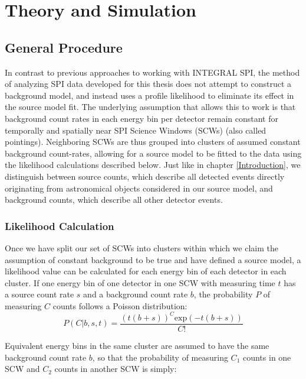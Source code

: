 \documentclass{report}
\begin{document}
\chapter{Theory and Simulation}

\section{General Procedure} \label{General Procedure}
In contrast to previous approaches to working with INTEGRAL SPI, the method of analyzing SPI data developed for this thesis does not attempt to construct a background model, and instead uses a profile likelihood to eliminate its effect in the source model fit. The underlying assumption that allows this to work is that background count rates in each energy bin per detector remain constant for temporally and spatially near SPI Science Windows (SCWs) (also called pointings). Neighboring SCWs are thus grouped into clusters of assumed constant background count-rates, allowing for a source model to be fitted to the data using the likelihood calculations described below. Just like in chapter \ref{Introduction}, we distinguish between source counts, which describe all detected events directly originating from astronomical objects considered in our source model, and background counts, which describe all other detector events.

\subsection{Likelihood Calculation}

Once we have split our set of SCWs into clusters within which we claim the assumption of constant background to be true and have defined a source model, a likelihood value can be calculated for each energy bin of each detector in each cluster. If one energy bin of one detector in one SCW with measuring time $t$ has a source count rate $s$ and a background count rate $b$, the probability $P$ of measuring $C$ counts follows a Poisson distribution:
\begin{equation}
    P(C \vert b, s, t) = \frac{\left( t \left( b + s \right) \right) ^C \text{exp}\left( -t \left( b+s\right)\right)}{C!}
\end{equation}

Equivalent energy bins in the same cluster are assumed to have the same background count rate $b$, so that the probability of measuring $C_1$ counts in one SCW and $C_2$ counts in another SCW is simply:
\end{document}
